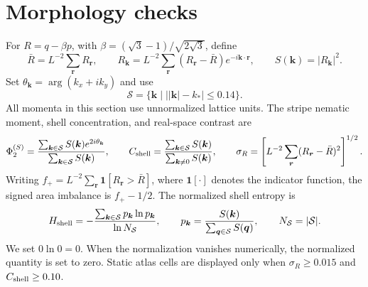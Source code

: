 \documentclass[aps,prl,twocolumn,superscriptaddress,nofootinbib,floatfix]{revtex4-2}
\newcommand{\PhiS}{\Phi_{2}^{(S)}}
\begin{document}
\section{Morphology checks}
For $R=q-\beta p$, with $\beta=(\sqrt3-1)/\sqrt{2\sqrt3}$, define
\begin{equation}
 \bar R=L^{-2}\sum_{\bm r}R_{\bm r},
 \qquad
 R_{\bm k}=L^{-2}\sum_{\bm r}(R_{\bm r}-\bar R)e^{-i\bm k\cdot\bm r},
 \qquad
 S(\bm k)=|R_{\bm k}|^2.
 \label{eq:fourierConventionS}
\end{equation}
Set $\theta_{\bm k}=\arg(k_x+ik_y)$ and use
\begin{equation}
 \mathcal S=\{\bm k\mathrel{|}\bigl||\bm k|-k_*\bigr|\le0.14\}.
 \label{eq:shellDefS}
\end{equation}
All momenta in this section use unnormalized lattice units. The stripe nematic moment, shell concentration, and real-space contrast are
\begin{align}
 \PhiS=\frac{\sum_{\bm k\in\mathcal S}S(\bm k)e^{2i\theta_{\bm k}}}{\sum_{\bm k\in\mathcal S}S(\bm k)},
 \qquad C_{\rm shell}=\frac{\sum_{\bm k\in\mathcal S}S(\bm k)}{\sum_{\bm k\ne0}S(\bm k)},\qquad
 \sigma_R=\left[L^{-2}\sum_{\bm r}(R_{\bm r}-\bar R)^2\right]^{1/2}.
 \label{eq:morphS}
\end{align}
Writing $f_+=L^{-2}\sum_{\bm r}\mathbf 1[R_{\bm r}>\bar R]$, where $\mathbf 1[\cdot]$ denotes the indicator function, the signed area imbalance is $f_+-1/2$. The normalized shell entropy is
\begin{equation}
 H_{\rm shell}=-\frac{\sum_{\bm k\in\mathcal S}p_{\bm k}\ln p_{\bm k}}{\ln N_{\mathcal S}},
 \qquad
 p_{\bm k}=\frac{S(\bm k)}{\sum_{\bm q\in\mathcal S}S(\bm q)},
 \qquad
 N_{\mathcal S}=|\mathcal S|.
 \label{eq:entropyS}
\end{equation}
We set $0\ln0=0$. When the normalization vanishes numerically, the normalized quantity is set to zero. Static atlas cells are displayed only when $\sigma_R\ge0.015$ and $C_{\rm shell}\ge0.10$.
\end{document}
